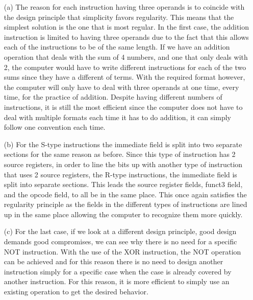 \documentclass[12pt]{article}
\begin{document}
        \begin{itemize}
            \item[(a)] The reason for each instruction having three operands is
                to coincide with the design principle that simplicity favors
                regularity.  This means that the simplest solution is the one
                that is most regular.  In the first case, the addition
                instruction is limited to having three operands due to the fact
                that this allows each of the instructions to be of the same
                length. If we have an addition operation that deals with the sum
                of 4 numbers, and one that only deals with 2, the computer would
                have to write different instructions for each of the two sums
                since they have a different of terms. With the required format
                however, the computer will only have to deal with three operands
                at one time, every time, for the practice of addition. Despite
                having different numbers of instructions, it is still the most
                efficient since the computer does not have to deal with multiple
                formats each time it has to do addition, it can simply follow
                one convention each time.
            \item[(b)]For the S-type instructions the immediate field is split
                into two separate sections for the same reason as before. Since
                this type of instruction has 2 source registers, in order to
                line the bits up with another type of instruction that uses 2
                source registers, the R-type instructions, the immediate field
                is split into separate sections. This leads the source register
                fields, funct3 field, and the opcode field, to all be in the
                same place. This once again satisfies the regularity principle
                as the fields in the different types of instructions are lined
                up in the same place allowing the computer to recognize them
                more quickly.
            \item[(c)]For the last case, if we look at a different design
                principle, good design demands good compromises, we can see why
                there is no need for a specific NOT instruction. With the use of
                the XOR instruction, the NOT operation can be achieved and for
                this reason there is no need to design another instruction
                simply for a specific case when the case is already covered by
                another instruction. For this reason, it is more efficient to
                simply use an existing operation to get the desired behavior.
        \end{itemize}
        \newpage
\end{document}
